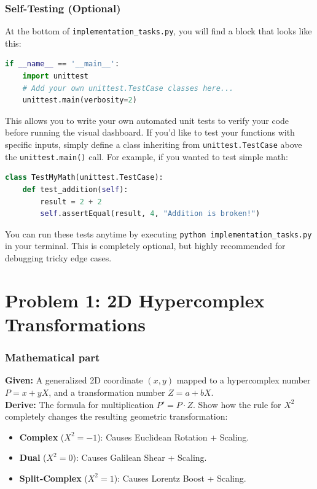\documentclass[11pt]{article}
\begin{document}
\subsubsection*{Self-Testing (Optional)}
At the bottom of \lstinline|implementation_tasks.py|, you will find a block that looks like this:
\begin{lstlisting}[language=Python]
if __name__ == '__main__':
    import unittest
    # Add your own unittest.TestCase classes here...
    unittest.main(verbosity=2)
\end{lstlisting}
This allows you to write your own automated unit tests to verify your code before running the visual dashboard. If you'd like to test your functions with specific inputs, simply define a class inheriting from \lstinline|unittest.TestCase| above the \lstinline|unittest.main()| call. For example, if you wanted to test simple math:
\begin{lstlisting}[language=Python]
class TestMyMath(unittest.TestCase):
    def test_addition(self):
        result = 2 + 2
        self.assertEqual(result, 4, "Addition is broken!")
\end{lstlisting}
You can run these tests anytime by executing \lstinline|python implementation_tasks.py| in your terminal. This is completely optional, but highly recommended for debugging tricky edge cases.
\section*{Problem 1: 2D Hypercomplex Transformations}

\subsubsection*{Mathematical part}
\textbf{Given:} A generalized 2D coordinate $(x, y)$ mapped to a hypercomplex number $P = x + yX$, and a transformation number $Z = a + bX$. \\
\textbf{Derive:} The formula for multiplication $P' = P \cdot Z$. Show how the rule for $X^2$ completely changes the resulting geometric transformation:
\begin{itemize}
    \item \textbf{Complex} ($X^2 = -1$): Causes Euclidean Rotation + Scaling.
    \item \textbf{Dual} ($X^2 = 0$): Causes Galilean Shear + Scaling.
    \item \textbf{Split-Complex} ($X^2 = 1$): Causes Lorentz Boost + Scaling.
\end{itemize}
\end{document}
